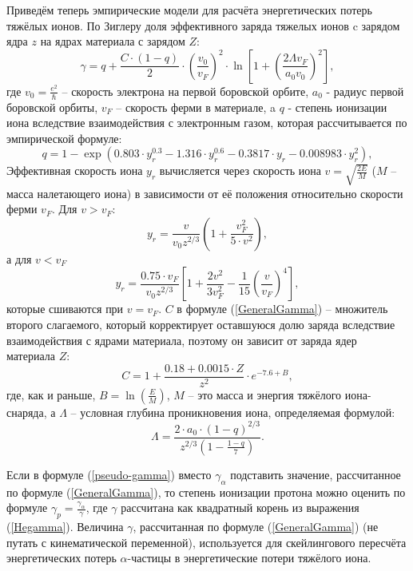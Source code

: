 \documentclass[a4paper,12pt]{article}
\begin{document}
\begin{large}
  Приведём теперь эмпирические модели для расчёта энергетических потерь тяжёлых ионов.  
  По Зиглеру доля эффективного заряда тяжелых ионов c зарядом ядра $z$ на ядрах материала с зарядом $Z$:
  \begin{equation}
  \label{GeneralGamma}
  \gamma=q+\frac{C\cdot(1-q)}{2}\cdot\left(\frac{v_0}{v_F}\right)^2\cdot\ln\left[1+\left(\frac{2\Lambda v_F}{a_0v_0}\right)^2\right],
  \end{equation}
 где $v_0=\frac{e^2}{\hbar}$ -- скорость электрона на первой боровской орбите, $a_0$ - радиус первой боровской орбиты, $v_F$ -- скорость ферми в материале, a $q$ - степень ионизации иона вследствие взаимодействия с электронным газом, которая рассчитывается по эмпирической формуле:
   \begin{equation}
  \label{DegreeOfIonisation}
  q=1-\exp(0.803\cdot y_r^{0.3}-1.316\cdot y_r^{0.6}-0.3817\cdot y_r-0.008983\cdot y_r^2),
  \end{equation}
  Эффективная скорость иона $y_r$ вычисляется через скорость иона $v=\sqrt{\frac{2E}{M}}$ ($M$ -- масса налетающего иона) в зависимости от её положения относительно скорости ферми $v_F$.
  Для $v>v_F$:
  \begin{equation}
  \label{effVelocity1}
  y_r=\frac{v}{v_0z^{2/3}}\left(1+\frac{v_F^2}{5\cdot v^2}\right),
  \end{equation}
  а для $v<v_F$
  \begin{equation}
  \label{effVelocity2}
  y_r=\frac{0.75\cdot v_F}{v_0z^{2/3}}\left[1+\frac{2v^2}{3v_F^2}-\frac{1}{15}\left(\frac{v}{v_F}\right)^{4}\right],
  \end{equation}
  которые сшиваются при $v=v_F$.
  $C$ в формуле (\ref{GeneralGamma}) -- множитель второго слагаемого, который корректирует оставшуюся долю заряда вследствие взаимодействия с ядрами материала, поэтому он зависит от заряда ядер материала $Z$:
  \begin{equation}
  \label{CorrFactor}
  C=1+\frac{0.18+0.0015\cdot Z}{z^2}\cdot e^{-7.6+B},
  \end{equation}
  где, как и раньше, $B=\ln(\frac{E}{M})$, $M$ -- это масса и энергия тяжёлого иона-снаряда, а $\Lambda$ -- условная глубина проникновения иона, определяемая формулой:
  \begin{equation}
  \label{ScreeningLength}
  \Lambda=\frac{2\cdot a_0\cdot (1-q)^{2/3}}{z^{2/3}(1-\frac{1-q}{7})}.
  \end{equation}

  Если в формуле (\ref{pseudo-gamma}) вместо $\gamma_\alpha$ подставить значение, рассчитанное по формуле (\ref{GeneralGamma}), то степень ионизации протона можно оценить по формуле $\gamma_p=\frac{\gamma_\alpha}{\gamma}$, где $\gamma$ рассчитана как квадратный корень из выражения (\ref{Hegamma}). Величина $\gamma$, рассчитанная по формуле (\ref{GeneralGamma}) (не путать с кинематической переменной), используется для скейлингового пересчёта энергетических потерь $\alpha$-частицы в энергетические потери тяжёлого иона.


\end{large}
\end{document}
